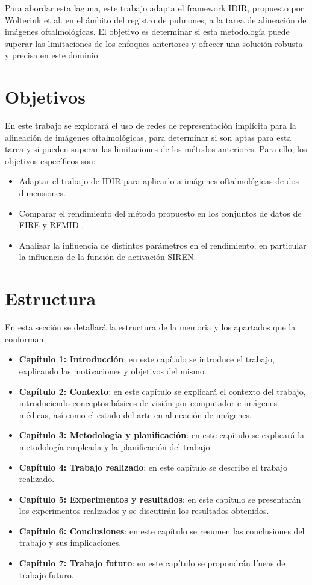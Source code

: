 Para abordar esta laguna, este trabajo adapta el framework IDIR, propuesto por Wolterink et al. \cite{wolterink2021implicit} en el ámbito del registro de pulmones, a la tarea de alineación de imágenes oftalmológicas. El objetivo es determinar si esta metodología puede superar las limitaciones de los enfoques anteriores y ofrecer una solución robusta y precisa en este dominio.

\section{Objetivos}
\label{sec:obxectivos}

En este trabajo se explorará el uso de redes de representación implícita para la alineación de imágenes oftalmológicas, para determinar si son aptas para esta tarea y si pueden superar las limitaciones de los métodos anteriores.
Para ello, los objetivos específicos son:
\begin{itemize}
    \item Adaptar el trabajo de IDIR \cite{wolterink2021implicit} para aplicarlo a imágenes oftalmológicas de dos dimensiones.
    \item Comparar el rendimiento del método propuesto en los conjuntos de datos de FIRE \cite{FIRE} y RFMID \cite{RFMiD}.
    \item Analizar la influencia de distintos parámetros en el rendimiento, en particular la influencia de la función de activación SIREN.
\end{itemize}

\section{Estructura}
\label{sec:estrutura}

En esta sección se detallará la estructura de la memoria y los apartados que la conforman.

\begin{itemize}
    \item \textbf{Capítulo 1: Introducción}: en este capítulo se introduce el trabajo, explicando las motivaciones y objetivos del mismo.
    \item \textbf{Capítulo 2: Contexto}: en este capítulo se explicará el contexto del trabajo, introduciendo conceptos básicos de visión por computador e imágenes médicas, así como el estado del arte en alineación de imágenes.
    \item \textbf{Capítulo 3: Metodología y planificación}: en este capítulo se explicará la metodología empleada y la planificación del trabajo.
    \item \textbf{Capítulo 4: Trabajo realizado}: en este capítulo se describe el trabajo realizado.
    \item \textbf{Capítulo 5: Experimentos y resultados}: en este capítulo se presentarán los experimentos realizados y se discutirán los resultados obtenidos.
    \item \textbf{Capítulo 6: Conclusiones}: en este capítulo se resumen las conclusiones del trabajo y sus implicaciones.
    \item \textbf{Capítulo 7: Trabajo futuro}: en este capítulo se propondrán líneas de trabajo futuro.
\end{itemize}
